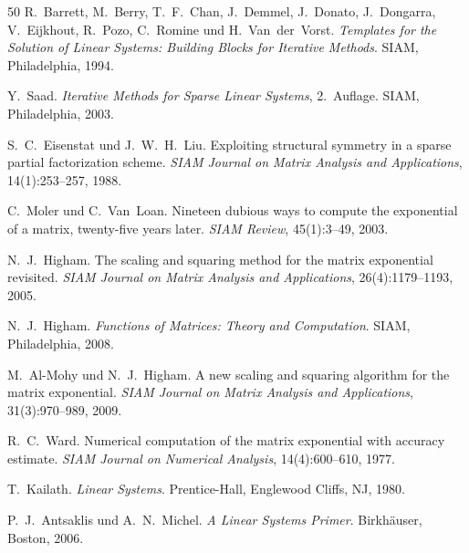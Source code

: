 ﻿\documentclass[a4paper,12pt]{report}
\theoremstyle{definition}
\begin{document}
\begin{thebibliography}{50}
R.~Barrett, M.~Berry, T.~F.~Chan, J.~Demmel, J.~Donato, J.~Dongarra, V.~Eijkhout, R.~Pozo, C.~Romine und H.~Van~der~Vorst.
\newblock \textit{Templates for the Solution of Linear Systems: Building Blocks for Iterative Methods}.
\newblock SIAM, Philadelphia, 1994.

Y.~Saad.
\newblock \textit{Iterative Methods for Sparse Linear Systems}, 2.~Auflage.
\newblock SIAM, Philadelphia, 2003.

S.~C.~Eisenstat und J.~W.~H.~Liu.
\newblock Exploiting structural symmetry in a sparse partial factorization scheme.
\newblock \textit{SIAM Journal on Matrix Analysis and Applications}, 14(1):253--257, 1988.

C.~Moler und C.~Van~Loan.
\newblock Nineteen dubious ways to compute the exponential of a matrix, twenty-five years later.
\newblock \textit{SIAM Review}, 45(1):3--49, 2003.

N.~J.~Higham.
\newblock The scaling and squaring method for the matrix exponential revisited.
\newblock \textit{SIAM Journal on Matrix Analysis and Applications}, 26(4):1179--1193, 2005.

N.~J.~Higham.
\newblock \textit{Functions of Matrices: Theory and Computation}.
\newblock SIAM, Philadelphia, 2008.

M.~Al-Mohy und N.~J.~Higham.
\newblock A new scaling and squaring algorithm for the matrix exponential.
\newblock \textit{SIAM Journal on Matrix Analysis and Applications}, 31(3):970--989, 2009.

R.~C.~Ward.
\newblock Numerical computation of the matrix exponential with accuracy estimate.
\newblock \textit{SIAM Journal on Numerical Analysis}, 14(4):600--610, 1977.

T.~Kailath.
\newblock \textit{Linear Systems}.
\newblock Prentice-Hall, Englewood Cliffs, NJ, 1980.

P.~J.~Antsaklis und A.~N.~Michel.
\newblock \textit{A Linear Systems Primer}.
\newblock Birkhäuser, Boston, 2006.


\end{thebibliography}
\end{document}
